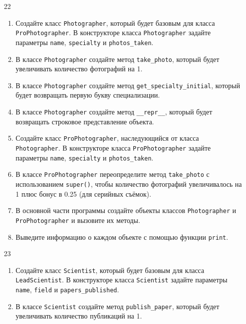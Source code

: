 \begin{enumerate}
\item[22] 
\begin{enumerate}
    \item Создайте класс \texttt{Photographer}, который будет базовым для класса \texttt{ProPhotographer}. В конструкторе класса \texttt{Photographer} задайте параметры \texttt{name}, \texttt{specialty} и \texttt{photos\_taken}.
    
    \item В классе \texttt{Photographer} создайте метод \texttt{take\_photo}, который будет увеличивать количество фотографий на 1.
    
    \item В классе \texttt{Photographer} создайте метод \texttt{get\_specialty\_initial}, который будет возвращать первую букву специализации.
    
    \item В классе \texttt{Photographer} создайте метод \texttt{\_\_repr\_\_}, который будет возвращать строковое представление объекта.
    
    \item Создайте класс \texttt{ProPhotographer}, наследующийся от класса \texttt{Photographer}. В конструкторе класса \texttt{ProPhotographer} задайте параметры \texttt{name}, \texttt{specialty} и \texttt{photos\_taken}.
    
    \item В классе \texttt{ProPhotographer} переопределите метод \texttt{take\_photo} с использованием \texttt{super()}, чтобы количество фотографий увеличивалось на 1 плюс бонус в 0.25 (для серийных съёмок).
    
    \item В основной части программы создайте объекты классов \texttt{Photographer} и \texttt{ProPhotographer} и вызовите их методы.
    
    \item Выведите информацию о каждом объекте с помощью функции \texttt{print}.
\end{enumerate}

\item[23] 
\begin{enumerate}
    \item Создайте класс \texttt{Scientist}, который будет базовым для класса \texttt{LeadScientist}. В конструкторе класса \texttt{Scientist} задайте параметры \texttt{name}, \texttt{field} и \texttt{papers\_published}.
    
    \item В классе \texttt{Scientist} создайте метод \texttt{publish\_paper}, который будет увеличивать количество публикаций на 1.
    

\end{enumerate}
\end{enumerate}
